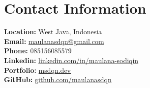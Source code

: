 \section*{Contact Information}
\textbf{Location:} West Java, Indonesia\\
\textbf{Email:} \href{mailto:maulanasdqn@gmail.com}{maulanasdqn@gmail.com} \\
\textbf{Phone:} 085156085579 \\
\textbf{Linkedin:} \href{https://linkedin.com/in/maulana-sodiqin}{linkedin.com/in/maulana-sodiqin} \\
\textbf{Portfolio:} \href{https://msdqn.dev}{msdqn.dev} \\
\textbf{GitHub:} \href{https://github.com/maulanasdqn}{github.com/maulanasdqn} \\
